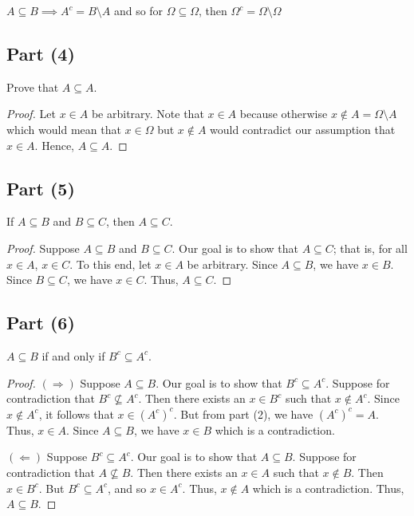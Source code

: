 \documentclass[a4paper]{article}
\begin{document}
\( A \subseteq B  \implies A^{c} = B \setminus  A \) and so for \( \Omega \subseteq \Omega   \), then \( \Omega^{c} = \Omega \setminus  \Omega \)




\subsection*{Part (4)}  Prove that \( A \subseteq  A  \).

\begin{proof}
    Let \( x \in A  \) be arbitrary. Note that \( x \in A  \) because otherwise \( x \notin A = \Omega \setminus  A  \) which would mean that \( x \in \Omega  \) but \( x \notin A  \) would contradict our assumption that \( x \in A  \). Hence, \( A \subseteq  A  \).
\end{proof}

\subsection*{Part (5)} If \( A \subseteq  B  \) and \( B \subseteq  C  \), then \( A \subseteq  C  \).

\begin{proof}
    Suppose \( A \subseteq  B  \) and \( B \subseteq  C  \). Our goal is to show that \( A \subseteq  C  \); that is, for all \( x \in A  \), \( x \in C  \). To this end, let \( x \in A  \) be arbitrary. Since \( A \subseteq B  \), we have \( x \in B \). Since \( B \subseteq C  \), we have \( x \in C  \). Thus, \( A \subseteq  C  \).
\end{proof}

\subsection*{Part (6)}

\( A \subseteq  B   \) if and only if \( B^{c} \subseteq  A^{c} \).

\begin{proof}
\( (\Longrightarrow) \) Suppose \( A \subseteq  B  \). Our goal is to show that \( B^{c} \subseteq A^{c} \). Suppose for contradiction that \( B^{c} \not\subseteq A^{c} \). Then there exists an \( x \in B^{c} \) such that \( x \notin A^{c}  \). Since \( x \notin A^{c}  \), it follows that \( x \in (A^{c})^{c} \). But from part (2), we have \( (A^{c})^{c} =A  \). Thus, \( x \in A  \). Since \( A \subseteq B \), we have \( x \in B \) which is a contradiction.

\( (\Longleftarrow) \) Suppose \( B^{c} \subseteq  A^{c} \). Our goal is to show that \( A \subseteq B \). Suppose for contradiction that \( A \not\subseteq B \). Then there exists an \( x \in A  \) such that \( x \notin B \). Then \( x \in B^{c} \). But \( B^{c} \subseteq A^{c}  \), and so \( x \in A^{c} \). Thus, \( x \notin A   \) which is a contradiction. Thus, \( A \subseteq B \).  
\end{proof}
\end{document}
